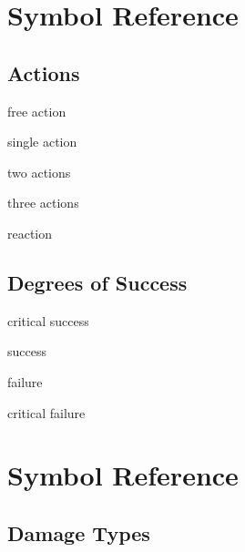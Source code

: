\documentclass[paper=63mm:88mm, DIV=21, fontsize=7.5pt]{scrartcl}
\begin{document}
\newcommand{\Trait}[1]{\Tag{traitBg}{#1}}
\newcommand{\Rare}[0]{\Tag{rareBg}{Rare}}
\newcommand{\Uncommon}[0]{\Tag{uncommonBg}{Uncommon}}

\newcommand{\Traits}[1]{\colorbox{tagsBg}{#1}}

\section{Symbol Reference}

\subsection{Actions\hfill{}}

 free action

 single action

 two actions

 three actions

 reaction

\subsection{Degrees of Success\hfill{}}
\begin{multicols}{2}
\footnotesize
{} critical success

 success

 failure

 critical failure
\end{multicols}

\section{Symbol Reference}
\subsection{Damage Types\hfill{}}
\end{document}
